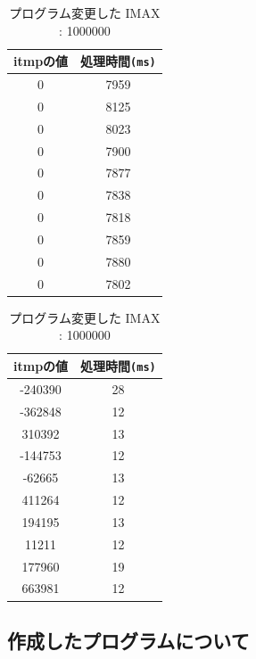 \documentclass[10pt]{jarticle}
\begin{document}
\newpage
\begin{table}
	\caption{プログラム変更した IMAX : 1000000}
	\label{table:re1000000}
	\begin{minipage}{.45\textwidth}
		\centering
		\label{table:remillionsemaari}
		\begin{tabular}{|c|c|}
			\hline
			itmpの値 & 処理時間\verb|(ms)|\\
			\hline
			0 & 7959\\
			0 & 8125\\
			0 & 8023\\
			0 & 7900\\
			0 & 7877\\
			0 & 7838\\
			0 & 7818\\
			0 & 7859\\
			0 & 7880\\
			0 & 7802\\
			\hline
		\end{tabular}
	\end{minipage}
	\begin{minipage}{.45\textwidth}
		\centering
		\label{table:remillionsemanasi}
		\begin{tabular}{|c|c|}
			\hline
			itmpの値 & 処理時間\verb|(ms)|\\
			\hline
			-240390 & 28 \\
			-362848 & 12 \\
			310392 & 13 \\
			-144753 & 12 \\
			-62665 & 13 \\
			411264 & 12 \\
			194195 & 13 \\
			11211 & 12 \\
			177960 & 19 \\
			663981 & 12 \\
			\hline
		\end{tabular}
	\end{minipage}
\end{table}
\clearpage

\subsection{作成したプログラムについて}


\newpage

\newpage

\newpage

\end{document}

